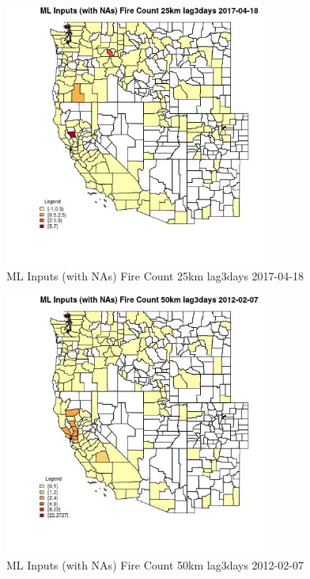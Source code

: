 \begin{figure} 
\centering  
\includegraphics[width=0.77\textwidth]{Code_Outputs/Report_ML_input_PM25_Step4_part_f_de_duplicated_aves_prioritize_24hr_obswNAs_CountyFire_Count_25km_lag3daysMean2017-04-18.jpg} 
\caption{\label{fig:Report_ML_input_PM25_Step4_part_f_de_duplicated_aves_prioritize_24hr_obswNAsCountyFire_Count_25km_lag3daysMean2017-04-18}ML Inputs (with NAs) Fire Count 25km lag3days 2017-04-18} 
\end{figure} 
 

\begin{figure} 
\centering  
\includegraphics[width=0.77\textwidth]{Code_Outputs/Report_ML_input_PM25_Step4_part_f_de_duplicated_aves_prioritize_24hr_obswNAs_CountyFire_Count_50km_lag3daysMean2012-02-07.jpg} 
\caption{\label{fig:Report_ML_input_PM25_Step4_part_f_de_duplicated_aves_prioritize_24hr_obswNAsCountyFire_Count_50km_lag3daysMean2012-02-07}ML Inputs (with NAs) Fire Count 50km lag3days 2012-02-07} 
\end{figure} 
 

